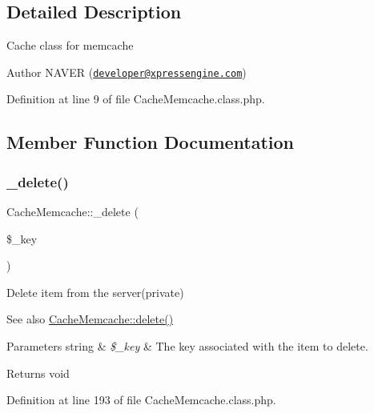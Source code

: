 \subsection{Detailed Description}
Cache class for memcache

\begin{DoxyAuthor}{Author}
N\+A\+V\+ER (\href{mailto:developer@xpressengine.com}{\tt developer@xpressengine.\+com}) 
\end{DoxyAuthor}


Definition at line 9 of file Cache\+Memcache.\+class.\+php.



\subsection{Member Function Documentation}
\mbox{\label{classCacheMemcache_a8ac0c5d0703aaeaabec2c478984d43fa}} 
\subsubsection{\texorpdfstring{\+\_\+delete()}{\_delete()}}
{\footnotesize\ttfamily Cache\+Memcache\+::\+\_\+delete (\begin{DoxyParamCaption}\item[{}]{\$\+\_\+key }\end{DoxyParamCaption})}

Delete item from the server(private)

\begin{DoxySeeAlso}{See also}
\hyperlink{classCacheMemcache_aca057fd092e1a938410a20e16d2d2d7f}{Cache\+Memcache\+::delete()} 
\end{DoxySeeAlso}

\begin{DoxyParams}[1]{Parameters}
string & {\em \$\+\_\+key} & The key associated with the item to delete. \\
\hline
\end{DoxyParams}
\begin{DoxyReturn}{Returns}
void 
\end{DoxyReturn}


Definition at line 193 of file Cache\+Memcache.\+class.\+php.

\mbox{\label{classCacheMemcache_ac4810e2e11716523e49df5a14b2fc215}} 
